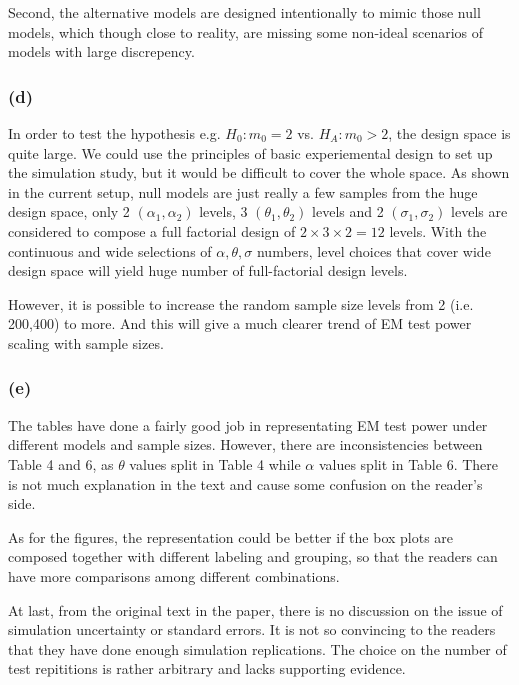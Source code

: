 \documentclass{article}
\begin{document}
Second, the alternative models are designed intentionally to mimic those null models, which though close to reality,
are missing some non-ideal scenarios of models with large discrepency.


\subsubsection*{(d)}

\hspace{12 pt} In order to test the hypothesis e.g. $H_0: m_0=2$ vs. $H_A: m_0 > 2$, the design space is quite large. 
We could use the principles of basic experiemental design to set up the simulation study, but it would be 
difficult to cover the whole space. As shown in the current setup, null models are just really a few 
samples from the huge design space, only 2 $(\alpha_1, \alpha_2)$ levels, 3 $(\theta_1, \theta_2)$ levels and
2 $(\sigma_1, \sigma_2)$ levels are considered to compose a full factorial design of $2\times 3\times 2=12$ levels.
With the continuous and wide selections of $\alpha, \theta, \sigma$ numbers, level choices that cover wide design
space will yield huge number of full-factorial design levels.

However, it is possible to increase the random sample size levels from 2 (i.e. 200,400) to more. And this will give
a much clearer trend of EM test power scaling with sample sizes.


\subsubsection*{(e)}

\hspace{12 pt} The tables have done a fairly good job in representating EM test power under different models and sample sizes.
However, there are inconsistencies between Table 4 and 6, as $\theta$ values split in Table 4 while $\alpha$ values
split in Table 6. There is not much explanation in the text and cause some confusion on the reader's side.

As for the figures, the representation could be better if the box plots are composed together with different labeling
and grouping, so that the readers can have more comparisons among different combinations.

At last, from the original text in the paper, there is no discussion on the issue of simulation uncertainty or standard
errors. It is not so convincing to the readers that they have done enough simulation replications. The choice on the
number of test repititions is rather arbitrary and lacks supporting evidence.
\end{document}
